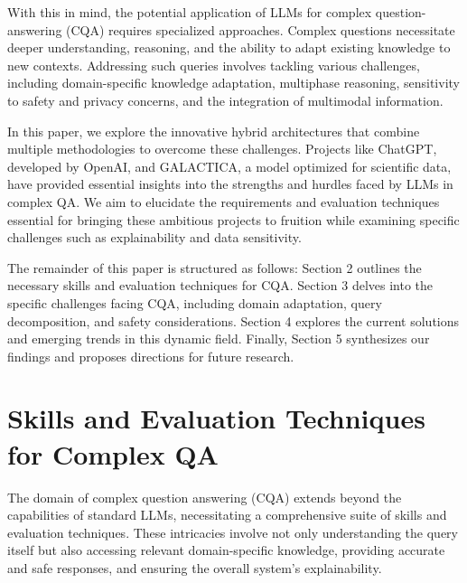\documentclass[12pt]{article}
\begin{document}
With this in mind, the potential application of LLMs for complex question-answering (CQA) requires specialized approaches. Complex questions necessitate deeper understanding, reasoning, and the ability to adapt existing knowledge to new contexts. Addressing such queries involves tackling various challenges, including domain-specific knowledge adaptation, multiphase reasoning, sensitivity to safety and privacy concerns, and the integration of multimodal information.

In this paper, we explore the innovative hybrid architectures that combine multiple methodologies to overcome these challenges. Projects like ChatGPT, developed by OpenAI, and GALACTICA, a model optimized for scientific data, have provided essential insights into the strengths and hurdles faced by LLMs in complex QA. We aim to elucidate the requirements and evaluation techniques essential for bringing these ambitious projects to fruition while examining specific challenges such as explainability and data sensitivity.

The remainder of this paper is structured as follows: Section 2 outlines the necessary skills and evaluation techniques for CQA. Section 3 delves into the specific challenges facing CQA, including domain adaptation, query decomposition, and safety considerations. Section 4 explores the current solutions and emerging trends in this dynamic field. Finally, Section 5 synthesizes our findings and proposes directions for future research.

\section{Skills and Evaluation Techniques for Complex QA}
The domain of complex question answering (CQA) extends beyond the capabilities of standard LLMs, necessitating a comprehensive suite of skills and evaluation techniques. These intricacies involve not only understanding the query itself but also accessing relevant domain-specific knowledge, providing accurate and safe responses, and ensuring the overall system's explainability. 
\end{document}
